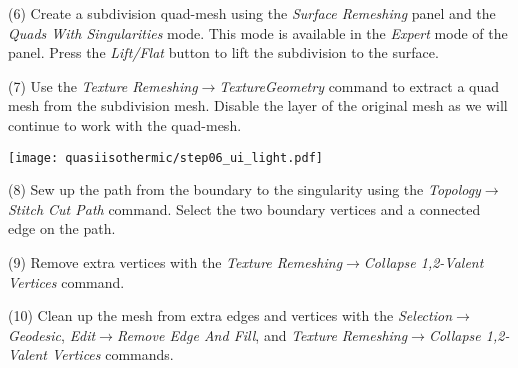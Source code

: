 \documentclass[Thesis.tex]{subfiles}
\begin{document}
\begin{compactenum}[(1)]
\begin{center}
\begin{minipage}{\linewidth}
            \centering
\end{minipage}
\end{center}     
            
\item[(6)] Create a subdivision quad-mesh using the \emph{Surface Remeshing} panel and the \emph{Quads With Singularities} mode. This mode is available in the \emph{Expert} mode of the panel. Press the \emph{Lift/Flat} button to lift the subdivision to the surface.
\item[(7)] Use the \emph{Texture Remeshing$\to$TextureGeometry} command to extract a quad mesh from the subdivision mesh. Disable the layer of the original mesh as we will continue to work with the quad-mesh.

\begin{center}
\begin{minipage}{0.75\linewidth}
            \centering
            \label{fig:three-step-remeshing}
\end{minipage}
\hfill
\begin{minipage}{0.24\linewidth}
\texttt{[image: quasiisothermic/step06\_ui\_light.pdf]}
\end{minipage}
\end{center}                 
            
\item[(8)] Sew up the path from the boundary to the singularity using the \emph{Topology$\to$ Stitch Cut Path} command. Select the two boundary vertices and a connected edge on the path.
\item[(9)] Remove extra vertices with the \emph{Texture Remeshing$\to$Collapse 1,2-Valent Vertices} command.
\item[(10)] Clean up the mesh from extra edges and vertices with the \emph{Selection$\to$Geodesic}, \emph{Edit$\to$Remove Edge And Fill}, and \emph{Texture Remeshing$\to$Collapse 1,2-Valent Vertices} commands.


\end{compactenum}
\end{document}
